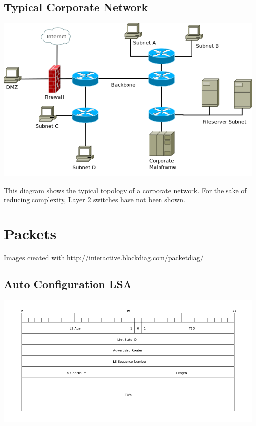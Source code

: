 \begin{landscape}
\chapter{Typical Corporate Network}
\label{typical_corporate_net}
\begin{center}
	\includegraphics[width=0.75\linewidth]{../Diagrams/Network/CorporateNetwork.png}
\end{center}
This diagram shows the typical topology of a corporate network. For the sake of reducing complexity, Layer 2 switches have not been shown.

\end{landscape}

\chapter{Packets}
Images created with http://interactive.blockdiag.com/packetdiag/

\section{Auto Configuration LSA}
\begin{center}
	\includegraphics[width=\linewidth]{../Diagrams/Packets/ac_lsa.png}
\end{center}

